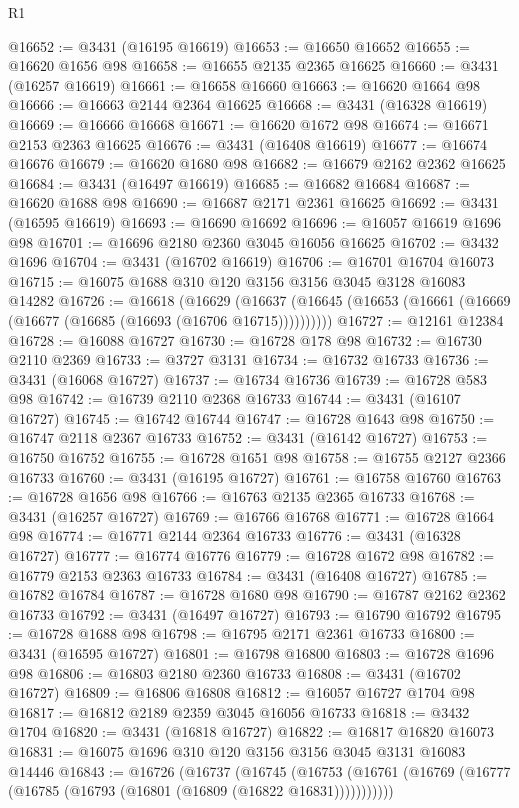 \begin{lexlean}{R1}
\begin{coremodule}
@16652 := @3431 (@16195 @16619)
@16653 := @16650 @16652
@16655 := @16620 @1656 @98
@16658 := @16655 @2135 @2365 @16625
@16660 := @3431 (@16257 @16619)
@16661 := @16658 @16660
@16663 := @16620 @1664 @98
@16666 := @16663 @2144 @2364 @16625
@16668 := @3431 (@16328 @16619)
@16669 := @16666 @16668
@16671 := @16620 @1672 @98
@16674 := @16671 @2153 @2363 @16625
@16676 := @3431 (@16408 @16619)
@16677 := @16674 @16676
@16679 := @16620 @1680 @98
@16682 := @16679 @2162 @2362 @16625
@16684 := @3431 (@16497 @16619)
@16685 := @16682 @16684
@16687 := @16620 @1688 @98
@16690 := @16687 @2171 @2361 @16625
@16692 := @3431 (@16595 @16619)
@16693 := @16690 @16692
@16696 := @16057 @16619 @1696 @98
@16701 := @16696 @2180 @2360 @3045 @16056 @16625
@16702 := @3432 @1696
@16704 := @3431 (@16702 @16619)
@16706 := @16701 @16704 @16073
@16715 := @16075 @1688 @310 @120 @3156 @3156 @3045 @3128 @16083 @14282
@16726 := @16618
    (@16629 (@16637 (@16645 (@16653 (@16661 (@16669 (@16677 (@16685 (@16693 (@16706 @16715))))))))))
@16727 := @12161 @12384
@16728 := @16088 @16727
@16730 := @16728 @178 @98
@16732 := @16730 @2110 @2369
@16733 := @3727 @3131
@16734 := @16732 @16733
@16736 := @3431 (@16068 @16727)
@16737 := @16734 @16736
@16739 := @16728 @583 @98
@16742 := @16739 @2110 @2368 @16733
@16744 := @3431 (@16107 @16727)
@16745 := @16742 @16744
@16747 := @16728 @1643 @98
@16750 := @16747 @2118 @2367 @16733
@16752 := @3431 (@16142 @16727)
@16753 := @16750 @16752
@16755 := @16728 @1651 @98
@16758 := @16755 @2127 @2366 @16733
@16760 := @3431 (@16195 @16727)
@16761 := @16758 @16760
@16763 := @16728 @1656 @98
@16766 := @16763 @2135 @2365 @16733
@16768 := @3431 (@16257 @16727)
@16769 := @16766 @16768
@16771 := @16728 @1664 @98
@16774 := @16771 @2144 @2364 @16733
@16776 := @3431 (@16328 @16727)
@16777 := @16774 @16776
@16779 := @16728 @1672 @98
@16782 := @16779 @2153 @2363 @16733
@16784 := @3431 (@16408 @16727)
@16785 := @16782 @16784
@16787 := @16728 @1680 @98
@16790 := @16787 @2162 @2362 @16733
@16792 := @3431 (@16497 @16727)
@16793 := @16790 @16792
@16795 := @16728 @1688 @98
@16798 := @16795 @2171 @2361 @16733
@16800 := @3431 (@16595 @16727)
@16801 := @16798 @16800
@16803 := @16728 @1696 @98
@16806 := @16803 @2180 @2360 @16733
@16808 := @3431 (@16702 @16727)
@16809 := @16806 @16808
@16812 := @16057 @16727 @1704 @98
@16817 := @16812 @2189 @2359 @3045 @16056 @16733
@16818 := @3432 @1704
@16820 := @3431 (@16818 @16727)
@16822 := @16817 @16820 @16073
@16831 := @16075 @1696 @310 @120 @3156 @3156 @3045 @3131 @16083 @14446
@16843 := @16726
    (@16737
      (@16745
        (@16753 (@16761 (@16769 (@16777 (@16785 (@16793 (@16801 (@16809 (@16822 @16831)))))))))))

\end{coremodule}
\end{lexlean}

